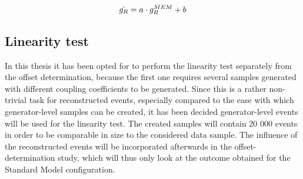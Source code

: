 %
\begin{equation} \label{eq::SlopeBias}
 \hat{g_R} = a \cdot g_{R}^{MEM} + b
\end{equation}

\subsection{Linearity test}

In this thesis it has been opted for to perform the linearity test separately from the offset determination, because the first one requires several samples generated with different coupling coefficients to be generated. Since this is a rather non-trivial task for reconstructed events, especially compared to the ease with which generator-level samples can be created, it has been decided generator-level events will be used for the linearity test. The created samples will contain 20 000 events in order to be comparable in size to the considered data sample.
The influence of the reconstructed events will be incorporated afterwards in the offset-determination study, which will thus only look at the outcome obtained for the Standard Model configuration.
\\

